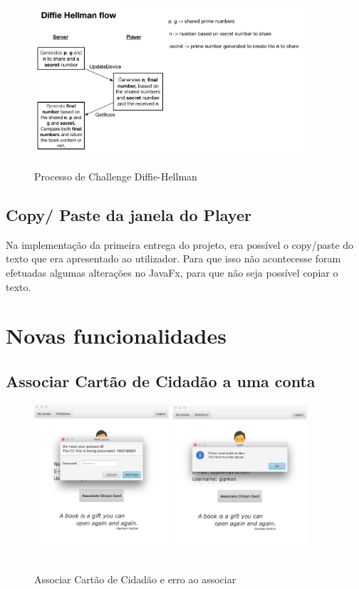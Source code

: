 \documentclass[pdftex,12pt,a4paper]{report}
\begin{document}
\begin{figure}[!htb]
\center
 \includegraphics[width=100mm,scale=1]{diffie-hellman.pdf}
 \caption{\\Processo de Challenge Diffie-Hellman}
 \label{fig:diffie}
\end{figure}

\subsection{Copy/ Paste da janela do Player}
Na implementação da primeira entrega do projeto, era possível o copy/paste do texto que era apresentado ao utilizador. Para que isso não acontecesse foram efetuadas algumas alterações no JavaFx, para que não seja possível copiar o texto.
\newpage
\section{Novas funcionalidades}
\subsection{Associar Cartão de Cidadão a uma conta}

\begin{figure}[!htb]
\center
 \includegraphics[width=50mm,scale=1]{Associate.png}
 \includegraphics[width=50mm,scale=1]{AssociateError.png}
 \caption{\\Associar Cartão de Cidadão e erro ao associar}
 \label{fig:associate}
\end{figure}
\end{document}
